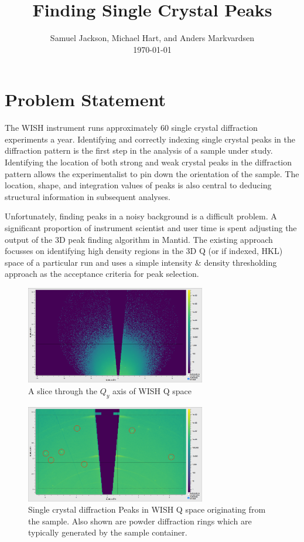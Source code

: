 \documentclass[paper=a4, fontsize=8pt]{scrartcl} \usepackage[T1]{fontenc}
\title{
		\huge Finding Single Crystal Peaks \\
}
\author{
		\normalfont 								\normalsize
        Samuel Jackson, Michael Hart, and Anders Markvardsen \\[-3pt]		\normalsize
        \today
}
\date{}
\begin{document}
 
\maketitle

\section{Problem Statement} 
The WISH instrument runs approximately 60 single
crystal diffraction experiments a year. Identifying and correctly indexing
single crystal peaks in the diffraction pattern is the first step in the analysis
of a sample under study.  Identifying the location of both strong and weak
crystal peaks in the diffraction pattern allows the experimentalist to pin down
the orientation of the sample. The location, shape, and integration values of peaks is also central
to deducing structural information in subsequent analyses.

Unfortunately, finding peaks in a noisy background is a difficult problem.  A
significant proportion of instrument scientist and user time is spent adjusting
the output of the 3D peak finding algorithm in Mantid. The existing approach
focusses on identifying high density regions in the 3D Q (or if indexed, HKL) 
space of a particular run and uses a simple intensity \& density thresholding approach as the 
acceptance criteria for peak selection.

\begin{figure}[H]
\centering
\includegraphics[width=0.7\textwidth]{WISH28145_4.png}
\caption{A slice through the $Q_y$ axis of WISH Q space}
\label{fig:wish-q-space}
\end{figure}

\begin{figure}[H]
\centering
\includegraphics[width=0.7\textwidth]{WISH28145_2.png}
\caption{Single crystal diffraction Peaks in WISH Q space originating from the 
    sample. Also shown are powder diffraction
    rings which are typically generated by the sample container.}
\label{fig:wish-peaks}
\end{figure}
\end{document}
